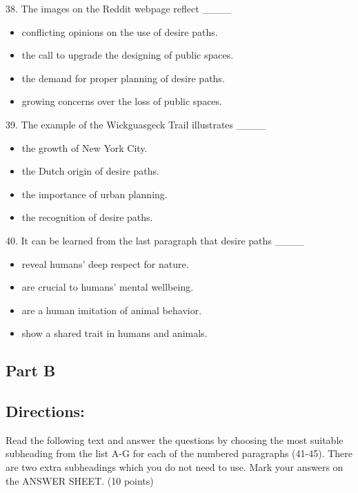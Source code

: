 \documentclass[UTF8,11pt]{ctexart}
\begin{document}
38. The images on the Reddit webpage reflect \_\_\_\_


\begin{itemize}[leftmargin=2em,itemsep=.2em,topsep=.4em]\item[A.] conflicting opinions on the use of desire paths.
\item[B.] the call to upgrade the designing of public spaces.
\item[C.] the demand for proper planning of desire paths.
\item[D.] growing concerns over the loss of public spaces.
\end{itemize}

39. The example of the Wickguasgeck Trail illustrates \_\_\_\_


\begin{itemize}[leftmargin=2em,itemsep=.2em,topsep=.4em]\item[A.] the growth of New York City.
\item[B.] the Dutch origin of desire paths.
\item[C.] the importance of urban planning.
\item[D.] the recognition of desire paths.
\end{itemize}

40. It can be learned from the last paragraph that desire paths \_\_\_\_


\begin{itemize}[leftmargin=2em,itemsep=.2em,topsep=.4em]\item[A.] reveal humans’ deep respect for nature.
\item[B.] are crucial to humans’ mental wellbeing.
\item[C.] are a human imitation of animal behavior.
\item[D.] show a shared trait in humans and animals.
\end{itemize}

\subsection*{\textbf{Part B}}


\subsection*{\textbf{Directions:}}


Read the following text and answer the questions by choosing the most suitable subheading from the list A-G for each of the numbered paragraphs (41-45). There are two extra subheadings which you do not need to use. Mark your answers on the ANSWER SHEET. (10 points)
\end{document}
